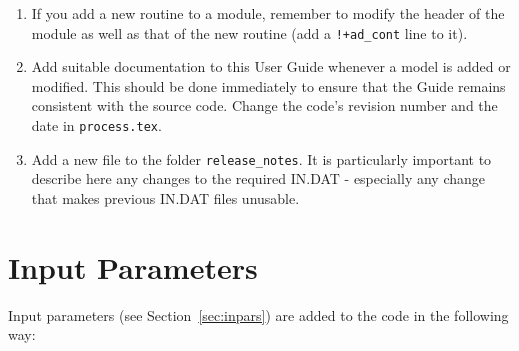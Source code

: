 \begin{enumerate}
\item If you add a new routine to a module, remember to modify the header of the module as well as that of the new routine (add a \verb.!+ad_cont. line to it).

\item Add suitable documentation to this User Guide whenever a
  model is added or modified. This should be done immediately to ensure that
  the Guide remains consistent with the source code. Change the code's revision
  number and the date in \texttt{process.tex}.
  
\item Add a new file to the folder \texttt{release\_notes}.  It is particularly important to describe here any changes to the required IN.DAT - especially any change that makes previous IN.DAT files unusable.  

\end{enumerate}

\section{Input Parameters}

Input parameters (see Section~\ref{sec:inpars}) are added to the code in the
following way:

